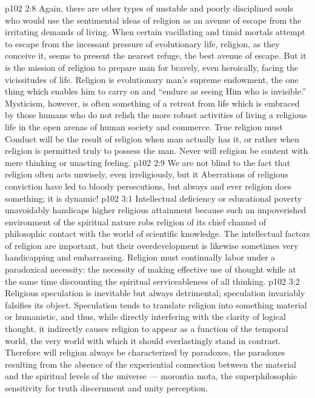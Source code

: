 \vs p102 2:8 Again, there are other types of unstable and poorly disciplined souls who would use the sentimental ideas of religion as an avenue of escape from the irritating demands of living. When certain vacillating and timid mortals attempt to escape from the incessant pressure of evolutionary life, religion, as they conceive it, seems to present the nearest refuge, the best avenue of escape. But it is the mission of religion to prepare man for bravely, even heroically, facing the vicissitudes of life. Religion is evolutionary man’s supreme endowment, the one thing which enables him to carry on and “endure as seeing Him who is invisible.” Mysticism, however, is often something of a retreat from life which is embraced by those humans who do not relish the more robust activities of living a religious life in the open arenas of human society and commerce. True religion must  Conduct will be the result of religion when man actually has it, or rather when religion is permitted truly to possess the man. Never will religion be content with mere thinking or unacting feeling.
\vs p102 2:9 We are not blind to the fact that religion often acts unwisely, even irreligiously, but it  Aberrations of religious conviction have led to bloody persecutions, but always and ever religion does something; it is dynamic!
\vs p102 3:1 Intellectual deficiency or educational poverty unavoidably handicaps higher religious attainment because such an impoverished environment of the spiritual nature robs religion of its chief channel of philosophic contact with the world of scientific knowledge. The intellectual factors of religion are important, but their overdevelopment is likewise sometimes very handicapping and embarrassing. Religion must continually labor under a paradoxical necessity: the necessity of making effective use of thought while at the same time discounting the spiritual serviceableness of all thinking.
\vs p102 3:2 Religious speculation is inevitable but always detrimental; speculation invariably falsifies its object. Speculation tends to translate religion into something material or humanistic, and thus, while directly interfering with the clarity of logical thought, it indirectly causes religion to appear as a function of the temporal world, the very world with which it should everlastingly stand in contrast. Therefore will religion always be characterized by paradoxes, the paradoxes resulting from the absence of the experiential connection between the material and the spiritual levels of the universe --- morontia mota, the superphilosophic sensitivity for truth discernment and unity perception.
